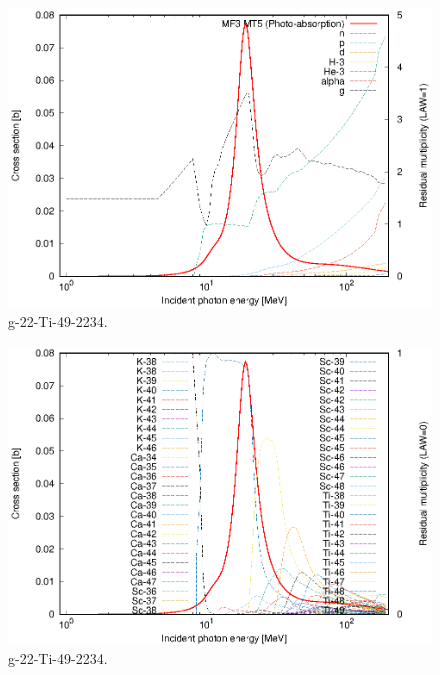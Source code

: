 \begin{figure}
 \includegraphics[width=\linewidth]{eps/g_22-Ti-49_2234.eps}
  \caption{g-22-Ti-49-2234.}
\end{figure}
\begin{figure}
 \includegraphics[width=\linewidth]{eps-law0/g_22-Ti-49_2234.eps}
 \caption{g-22-Ti-49-2234.}
\end{figure}
\newpage \clearpage

